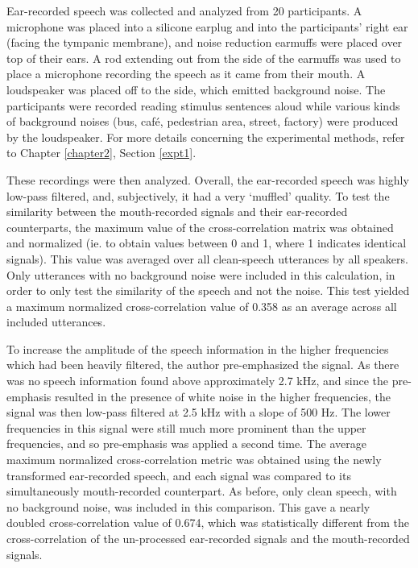 Ear-recorded speech was collected and analyzed from 20 participants.  A microphone was placed into a silicone earplug and into the participants' right ear (facing the tympanic membrane), and noise reduction earmuffs were placed over top of their ears.  A rod extending out from the side of the earmuffs was used to place a microphone recording the speech as it came from their mouth.  A loudspeaker was placed off to the side, which emitted background noise.  The participants were recorded reading stimulus sentences aloud while various kinds of background noises (bus, caf\'{e}, pedestrian area, street, factory) were produced by the loudspeaker.  For more details concerning the experimental methods, refer to Chapter \ref{chapter2}, Section \ref{expt1}.

These recordings were then analyzed.  Overall, the ear-recorded speech was highly low-pass filtered, and, subjectively, it had a very `muffled' quality.  To test the similarity between the mouth-recorded signals and their ear-recorded counterparts, the maximum value of the cross-correlation matrix was obtained and normalized (ie. to obtain values between 0 and 1, where 1 indicates identical signals).  This value was averaged over all clean-speech utterances by all speakers.  Only utterances with no background noise were included in this calculation, in order to only test the similarity of the speech and not the noise.  This test yielded a maximum normalized cross-correlation value of 0.358 as an average across all included utterances.

To increase the amplitude of the speech information in the higher frequencies which had been heavily filtered, the author pre-emphasized the signal.  As there was no speech information found above approximately 2.7 kHz, and since the pre-emphasis resulted in the presence of white noise in the higher frequencies, the signal was then low-pass filtered at 2.5 kHz with a slope of 500 Hz.  The lower frequencies in this signal were still much more prominent than the upper frequencies, and so pre-emphasis was applied a second time.  The average maximum normalized cross-correlation metric was obtained using the newly transformed ear-recorded speech, and each signal was compared to its simultaneously mouth-recorded counterpart.  As before, only clean speech, with no background noise, was included in this comparison.  This gave a nearly doubled cross-correlation value of 0.674, which was statistically different from the cross-correlation of the un-processed ear-recorded signals and the mouth-recorded signals.

